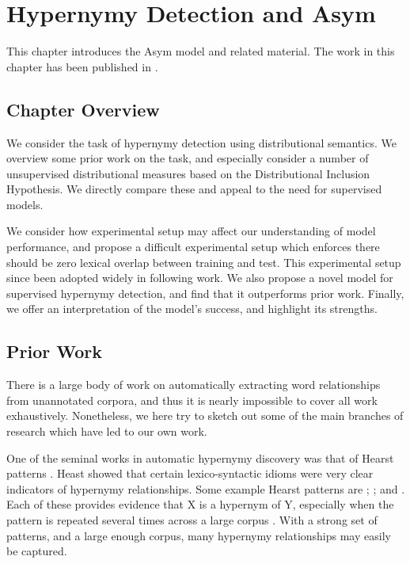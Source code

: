 \chapter{Hypernymy Detection and Asym}
\label{ch:lexmem}

This chapter introduces the Asym model and related material. The work
in this chapter has been published in .

\section{Chapter Overview}

We consider the task of hypernymy detection using distributional semantics.
We overview some prior work on the task, and especially consider a number
of unsupervised distributional measures based on the Distributional Inclusion
Hypothesis. We directly compare these and appeal to the need for supervised
models.

We consider how experimental setup may affect our understanding of model
performance, and propose a difficult experimental setup which enforces
there should be zero lexical overlap between training and test. This
experimental setup since been adopted widely in following work.
We also propose a novel model for supervised hypernymy detection, and find
that it outperforms prior work. Finally, we offer an interpretation of the
model's success, and highlight its strengths.

\section{Prior Work}

There is a large body of work on automatically extracting word relationships
from unannotated corpora, and thus it is nearly impossible to cover all work
exhaustively. Nonetheless, we here try to sketch out some of the main branches
of research which have led to our own work.

One of the seminal works in automatic hypernymy discovery was that of Hearst
patterns \cite{hearst:1992:coling}. Heast showed that certain lexico-syntactic
idioms were very clear indicators of hypernymy relationships. Some example
Hearst patterns are ; ; and 
. Each of these provides evidence that X is a hypernym of Y,
especially when the pattern is repeated several times across a large corpus
\cite{hearst:1992:coling}. With a strong set of patterns, and a large enough
corpus, many hypernymy relationships may easily be captured. 


